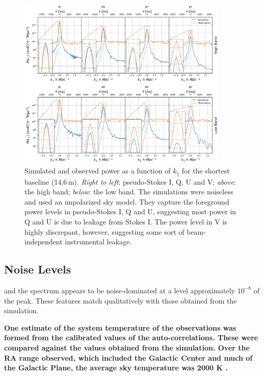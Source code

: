 \documentclass[twocolumn, trackchanges]{aastex61}
\newcommand{\edited}[1]{{\bf \color{red} #1}}
\begin{document}
\begin{figure}[h]
\centering
\includegraphics[width=0.9\textwidth]{real_sim_compare.png}
\caption{Simulated and observed power as a function of $k_{\parallel}$ for the shortest baseline (14.6\,m). \textit{Right to left}: pseudo-Stokes I, Q, U and V; \textit{above}: the high band; \textit{below}: the low band. The simulations were noiseless and used an unpolarized sky model. They capture the foreground power levels in pseudo-Stokes I, Q and U, suggesting most power in Q and U is due to leakage from Stokes I. The power level in V is highly discrepant, however, suggesting some sort of beam-independent instrumental leakage.}
\label{fig:bl0_cuts_vs_sim}
\end{figure}


\subsection{\edited{Noise Levels}}
\label{sec:Noise}

and the spectrum appears to be noise-dominated at a level approximately $10^{-8}$ of the peak.  These features match qualitatively with those obtained from the simulation.

\edited{One estimate of the system temperature of the observations was formed from the calibrated values of the auto-correlations.  These were compared against the values obtained from the simulation.  Over the RA range observed, which included the Galactic Center and much of the Galactic Plane, the average sky temperature was 2000 K \citep[][also see the public \href{http://reionization.org/wp-content/uploads/2017/04/HERA19_Tsys_3April2017.pdf}{\edited{\underline{HERA Memo \#16}}}]{deBoer17}.}
\end{document}
